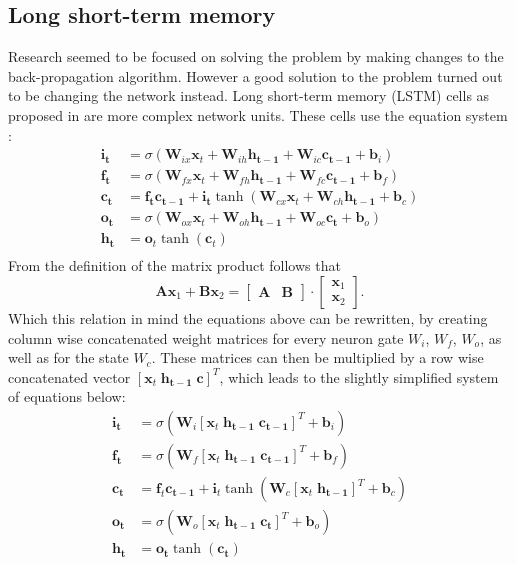 \subsection{Long short-term memory}
Research seemed to be focused on solving the problem by making changes to the back-propagation algorithm. However a good solution to the problem turned out to
be changing the network instead. Long short-term memory (LSTM) cells as proposed in \cite{Hochreiter1995} are more complex network units.
These cells use the equation system \cite[page 5]{Graves2013}:
\begin{align}
\mathbf{i_t} &= \sigma (\mathbf{W}_{ix} \mathbf{x}_t + \mathbf{W}_{ih} \mathbf{h_{t-1}} + \mathbf{W}_{ic} \mathbf{c_{t-1}} +\mathbf{ b}_i) \\
\mathbf{f_t} &= \sigma (\mathbf{W}_{fx} \mathbf{x}_t + \mathbf{W}_{fh} \mathbf{h_{t-1}} + \mathbf{W}_{fc} \mathbf{c_{t-1}} +\mathbf{ b}_f) \\
\mathbf{c_t} &= \mathbf{f_t} \mathbf{c_{t-1}} + \mathbf{i_t} \tanh( \mathbf{W}_{cx} \mathbf{x}_t + \mathbf{W}_{ch} \mathbf{h_{t-1}} + \mathbf{b}_c ) \\
\mathbf{o_t} &= \sigma (\mathbf{W}_{ox} \mathbf{x}_t + \mathbf{W}_{oh} \mathbf{h_{t-1}} + \mathbf{W}_{oc} \mathbf{c_t} + \mathbf{b}_o ) \\
\mathbf{h_t} &= \mathbf{o}_t \tanh(\mathbf{c}_t) \\
\end{align}
From the definition of the matrix product follows that
\begin{equation}
\mathbf{A}\mathbf{x}_1 + \mathbf{B}\mathbf{x}_2
=
\begin{bmatrix} \mathbf{A} & \mathbf{B} \end{bmatrix} \cdot
\begin{bmatrix} \mathbf{x}_1 \\ \mathbf{x}_2 \end{bmatrix}.
\end{equation}
Which this relation in mind the equations above can be rewritten, by creating column wise concatenated weight matrices for every neuron gate $W_i$, $W_f$, $W_o$, as well as for the state $W_c$. These matrices can then be multiplied by a row wise concatenated vector $[\mathbf{x}_t \; \mathbf{h_{t-1}} \; \mathbf{c}]^T$, which leads to the slightly simplified system of equations below:
\begin{align}
\mathbf{i_t} &= \sigma (\mathbf{W}_i [\mathbf{x}_t \; \mathbf{h_{t-1}} \; \mathbf{c_{t-1}}]^T + \mathbf{b}_i) \\
\mathbf{f_t} &= \sigma (\mathbf{W}_f [\mathbf{x}_t \; \mathbf{h_{t-1}} \; \mathbf{c_{t-1}}]^T + \mathbf{b}_f) \\
\mathbf{c_t} &= \mathbf{f}_t \mathbf{c_{t-1}} + \mathbf{i}_t \tanh( \mathbf{W}_c [\mathbf{x}_t \; \mathbf{h_{t-1}}]^T + \mathbf{b}_c ) \\
\mathbf{o_t} &= \sigma (\mathbf{W}_o [\mathbf{x}_t \; \mathbf{h_{t-1}} \; \mathbf{c_t}]^T + \mathbf{b}_o ) \\
\mathbf{h_t} &= \mathbf{o_t} \tanh(\mathbf{c_t})
\end{align}
